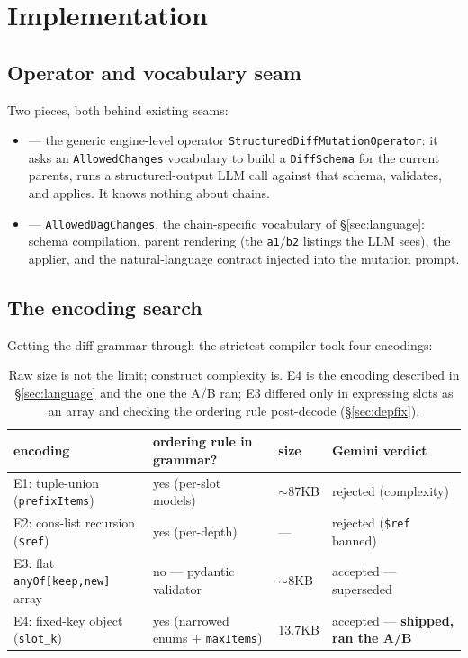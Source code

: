 \documentclass[11pt]{article}
\begin{document}
\section{Implementation}

\subsection{Operator and vocabulary seam}
Two pieces, both behind existing seams:
\begin{itemize}
  \item {} --- the generic engine-level
  operator \texttt{StructuredDiffMutationOperator}: it asks an \texttt{AllowedChanges}
  vocabulary to build a \texttt{DiffSchema} for the current parents, runs a
  structured-output LLM call against that schema, validates, and applies. It knows nothing
  about chains.
  \item {} --- \texttt{AllowedDagChanges}, the
  chain-specific vocabulary of \S\ref{sec:language}: schema compilation, parent rendering
  (the \texttt{a1}/\texttt{b2} listings the LLM sees), the applier, and the natural-language
  contract injected into the mutation prompt.
\end{itemize}

\subsection{The encoding search}
\label{sec:encodings}
Getting the diff grammar through the strictest compiler took four encodings:
\begin{table}[H]\centering\footnotesize
\begin{tabular}{llll}
\toprule
encoding & ordering rule in grammar? & size & Gemini verdict \\
\midrule
E1: tuple-union (\texttt{prefixItems}) & yes (per-slot models) & $\sim$87KB & rejected (complexity) \\
E2: cons-list recursion (\texttt{\$ref}) & yes (per-depth) & --- & rejected (\texttt{\$ref} banned) \\
E3: flat \texttt{anyOf[keep,new]} array & \textcolor{bad}{no --- pydantic validator} & $\sim$8KB & accepted --- superseded \\
E4: fixed-key object (\texttt{slot\_k}) & \textcolor{good}{yes (narrowed enums + \texttt{maxItems})} & 13.7KB & \textcolor{good}{accepted --- \textbf{shipped, ran the A/B}} \\
\bottomrule
\end{tabular}
\caption{Raw size is not the limit; construct complexity is. E4 is the encoding described in
\S\ref{sec:language} and the one the A/B ran; E3 differed only in expressing slots as an
array and checking the ordering rule post-decode (\S\ref{sec:depfix}).}
\end{table}
\end{document}
